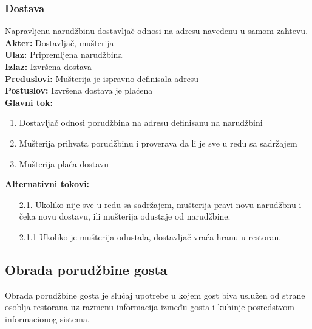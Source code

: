 \documentclass{article}
\begin{document}
\subsubsection{Dostava}
Napravljenu narudžbinu dostavljač odnosi na adresu navedenu u samom zahtevu.\\
\textbf{Akter:} Dostavljač, mušterija\\
\textbf{Ulaz:} Pripremljena narudžbina\\
\textbf{Izlaz:} Izvršena dostava\\
\textbf{Preduslovi:} Mušterija je ispravno definisala adresu\\
\textbf{Postuslov:}  Izvršena dostava je plaćena\\
\textbf{Glavni tok:}
\begin{enumerate}
\item Dostavljač odnosi porudžbina na adresu definisanu na narudžbini
\item Mušterija prihvata porudžbinu i proverava da li je sve u redu sa sadržajem
\item Mušterija plaća dostavu
\end{enumerate}
\textbf{Alternativni tokovi:}\\
\begin{itemize}
\item [2.1.]  Ukoliko nije sve u redu sa sadržajem, mušterija pravi novu narudžbnu i čeka novu dostavu, ili mušterija odustaje od narudžbine.
\item [2.1.1] Ukoliko je mušterija odustala, dostavljač vraća hranu u restoran.
\end{itemize}


\subsection{Obrada porudžbine gosta}
Obrada porudžbine gosta je slučaj upotrebe u kojem gost biva uslužen od strane osoblja restorana uz razmenu informacija između gosta i kuhinje posredstvom informacionog sistema.
\end{document}
